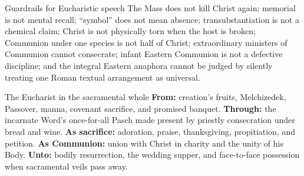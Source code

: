 \begin{studybox}{Guardrails for Eucharistic speech}
The Mass does not kill Christ again; memorial is not mental recall; ``symbol'' does not mean absence; transubstantiation is not a chemical claim; Christ is not physically torn when the host is broken; Communion under one species is not half of Christ; extraordinary ministers of Communion cannot consecrate; infant Eastern Communion is not a defective discipline; and the integral Eastern anaphora cannot be judged by silently treating one Roman textual arrangement as universal.
\end{studybox}

\begin{massbox}{The Eucharist in the sacramental whole}
\textbf{From:} creation's fruits, Melchizedek, Passover, manna, covenant sacrifice, and promised banquet. \textbf{Through:} the incarnate Word's once-for-all Pasch made present by priestly consecration under bread and wine. \textbf{As sacrifice:} adoration, praise, thanksgiving, propitiation, and petition. \textbf{As Communion:} union with Christ in charity and the unity of his Body. \textbf{Unto:} bodily resurrection, the wedding supper, and face-to-face possession when sacramental veils pass away.
\end{massbox}
